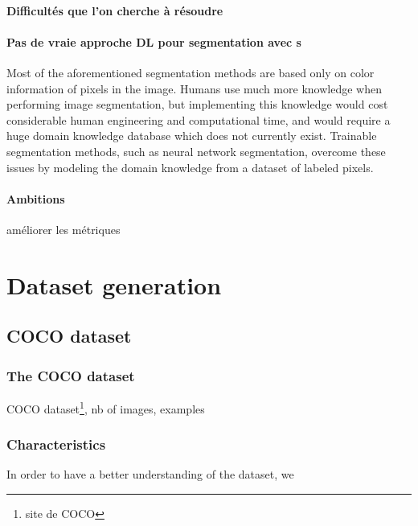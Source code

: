 \documentclass{article}
\begin{document}
                \paragraph{Difficultés que l'on cherche à résoudre}
                \paragraph{Pas de vraie approche DL pour segmentation avec \spp s} Most of the aforementioned segmentation methods are based only on color information of pixels in the image. Humans use much more knowledge when performing image segmentation, but implementing this knowledge would cost considerable human engineering and computational time, and would require a huge domain knowledge database which does not currently exist. Trainable segmentation methods, such as neural network segmentation, overcome these issues by modeling the domain knowledge from a dataset of labeled pixels.
                \paragraph{Ambitions}
                améliorer les métriques









\section{Dataset generation}
    \subsection{COCO dataset}
        \subsubsection{The COCO dataset}
        COCO dataset\footnote{site de COCO}, nb of images, examples

        \subsubsection{Characteristics}
        \label{par:charac}
        In order to have a better understanding of the dataset, we
\end{document}
